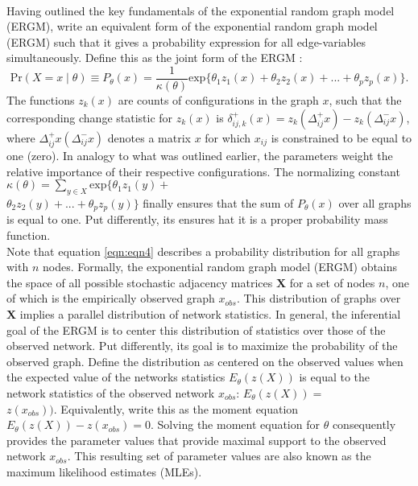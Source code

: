 \documentclass[a4paper, man, floatsintext]{apa6}
\begin{document}
\\
Having outlined the key fundamentals of the exponential random graph model (ERGM), write an equivalent form of the exponential random graph model (ERGM) such that it gives a probability expression for all edge-variables simultaneously. Define this as the joint form of the ERGM : \begin{equation} \label{eqn:eqn4} \text{Pr}(X = x \mid \theta) \equiv P_{\theta}(x) = \frac{1}{\kappa(\theta)}\text{exp}\{\theta_{1}z_{1}(x) + \theta_{2}z_{2}(x) + ... + \theta_{p}z_{p}(x)\}. \end{equation} The functions $z_{k}(x)$ are counts of configurations in the graph $x$, such that the corresponding change statistic for $z_{k}(x)$ is $\delta_{ij, k}^{+}(x) = z_{k}(\Delta_{ij}^{+}x) − z_{k}(\Delta_{ij}^{-}x)$, where $\Delta_{ij}^{+}x(\Delta_{ij}^{-}x)$ denotes a matrix $x$ for which $x_{ij}$ is constrained to be equal to one (zero). In analogy to what was outlined earlier, the parameters weight the relative importance of their respective configurations. The normalizing constant $\kappa(\theta) = \sum_{y \in X} \text{exp}\{\theta_{1}z_{1}(y) +$ \\ \noindent $\theta_{2}z_{2}(y)+ ... + \theta_{p}z_{p}(y)\}$ finally ensures that the sum of $P_{\theta}(x)$ over all graphs is equal to one. Put differently, its ensures hat it is a proper probability mass function. 
\\
Note that equation \eqref{eqn:eqn4} describes a probability distribution for all graphs with $n$ nodes. Formally, the exponential random graph model (ERGM) obtains the space of all possible stochastic adjacency matrices $\textbf{X}$ for a set of nodes $n$, one of which is the empirically observed graph $x_{obs}$. This distribution of graphs over $\textbf{X}$ implies a parallel distribution of network statistics. In general, the inferential goal of the ERGM is to center this distribution of statistics over those of the observed network. Put differently, its goal is to maximize the probability of the observed graph. Define the distribution as centered on the observed values when the expected value of the networks statistics $E_{\theta}(z(X))$ is equal to the network statistics of the observed network $x_{obs}$: $E_{\theta}(z(X)) =$ \\ \noindent $z(x_{obs}))$. Equivalently, write this as the moment equation $E_{\theta}(z(X)) − z(x_{obs}) = 0$. Solving the moment equation for $\theta$ consequently provides the parameter values that provide maximal support to the observed network $x_{obs}$. \clearpage \noindent This resulting set of parameter values are also known as the maximum likelihood estimates (MLEs). 
\end{document}
